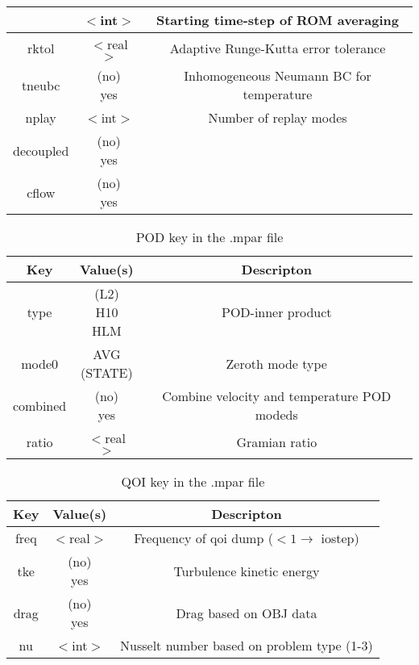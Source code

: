 \begin{table}[!h]
\begin{tabular}{|c|c|c|}
      &  $<$int$>$       & Starting time-step of ROM averaging \\ \hline rktol
      &  $<$real$>$      & Adaptive Runge-Kutta error tolerance \\ \hline
      tneubc                    &  \makecell{(no)\\yes}        &  Inhomogeneous
      Neumann BC for temperature          \\ \hline nplay                     &
      $<$int$>$       & Number of replay modes           \\ \hline decoupled
      &  \makecell{(no)\\yes}        &            \\ \hline cflow
   &  \makecell{(no)\\yes}        &            \\ \hline \end{tabular}
\end{table}

\begin{table}[!h] \caption{POD key in the .mpar file} \centering
   \begin{tabular}{|c|c|c|} \hline \multicolumn{1}{|c|}{Key} & Value(s) &
Descripton \\ \hline type & \makecell{(L2)\\H10\\HLM}      & POD-inner
product \\ \hline
mode0                     & \makecell{AVG\\(STATE)}    &  Zeroth mode type\\ \hline
combined                  & \makecell{(no)\\yes}    &  Combine velocity and temperature POD modeds\\ \hline
ratio                     &  $<$real$>$       & Gramian ratio \\ \hline
\end{tabular}
\end{table}

\begin{table}[!h] \caption{QOI key in the .mpar file} \centering
   \begin{tabular}{|c|c|c|} \hline \multicolumn{1}{|c|}{Key} & Value(s) &
Descripton \\ \hline
freq & $<$real$>$      & Frequency of qoi dump ($<1 \rightarrow$ iostep) \\ \hline
tke  & \makecell{(no)\\yes}    & Turbulence kinetic energy \\ \hline
drag & \makecell{(no)\\yes}      & Drag based on OBJ data \\ \hline
nu   & $<$int$>$       & Nusselt number based on problem type (1-3) \\ \hline
\end{tabular}
\end{table}
